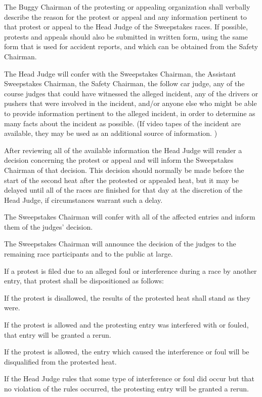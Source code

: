 The Buggy Chairman of the protesting or appealing organization shall verbally describe the reason for the protest or appeal and any information pertinent to that protest or appeal to the Head Judge of the Sweepstakes races. If possible, protests and appeals should also be submitted in written form, using the same form that is used for accident reports, and which can be obtained from the Safety Chairman.

The Head Judge will confer with the Sweepstakes Chairman, the Assistant Sweepstakes Chairman, the Safety Chairman, the follow car judge, any of the course judges that could have witnessed the alleged incident, any of the drivers or pushers that were involved in the incident, and/or anyone else who might be able to provide information pertinent to the alleged incident, in order to determine as many facts about the incident as possible. (If video tapes of the incident are available, they may be used as an additional source of information. )

After reviewing all of the available information the Head Judge will render a decision concerning the protest or appeal and will inform the Sweepstakes Chairman of that decision. This decision should normally be made before the start of the second heat after the protested or appealed heat, but it may be delayed until all of the races are finished for that day at the discretion of the Head Judge, if circumstances warrant such a delay.

The Sweepstakes Chairman will confer with all of the affected entries and inform them of the judges' decision.

The Sweepstakes Chairman will announce the decision of the judges to the remaining race participants and to the public at large.

If a protest is filed due to an alleged foul or interference during a race by another entry, that protest shall be dispositioned as follows:

If the protest is disallowed, the results of the protested heat shall stand as they were.

If the protest is allowed and the protesting entry was interfered with or fouled, that entry will be granted a rerun.

If the protest is allowed, the entry which caused the interference or foul will be disqualified from the protested heat.

If the Head Judge rules that some type of interference or foul did occur but that no violation of the rules occurred, the protesting entry will be granted a rerun.

